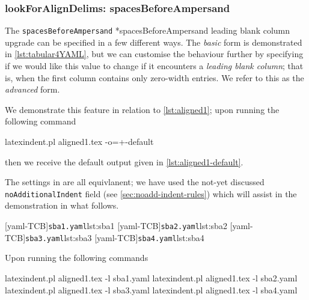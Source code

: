 \documentclass[10pt]{article}
\begin{document}
\subsubsection{lookForAlignDelims: spacesBeforeAmpersand}
 The \texttt{spacesBeforeAmpersand} *{spacesBeforeAmpersand leading
 blank column upgrade} can be specified in a few different ways. The \emph{basic} form is
 demonstrated in \cref{lst:tabular4YAML}, but we can customise the behaviour further by
 specifying if we would like this value to change if it encounters a \emph{leading blank
 column}; that is, when the first column contains only zero-width entries. We refer to
 this as the \emph{advanced} form.%

 \begin{example}
 We demonstrate this feature in relation to \cref{lst:aligned1}; upon running the
 following command

 \begin{commandshell}
latexindent.pl aligned1.tex -o=+-default
\end{commandshell}

 then we receive the default output given in \cref{lst:aligned1-default}.

 \begin{cmhtcbraster}
 \end{cmhtcbraster}

 The settings in  are all equivlanent; we have used the
 not-yet discussed \texttt{noAdditionalIndent} field (see \vref{sec:noadd-indent-rules})
 which will assist in the demonstration in what follows.
 \begin{cmhtcbraster}[raster columns=2, ]
  [yaml-TCB]{\texttt{sba1.yaml}}{lst:sba1}
  [yaml-TCB]{\texttt{sba2.yaml}}{lst:sba2}
  [yaml-TCB]{\texttt{sba3.yaml}}{lst:sba3}
  [yaml-TCB]{\texttt{sba4.yaml}}{lst:sba4}
 \end{cmhtcbraster}
 Upon running the following commands

 \begin{commandshell}
latexindent.pl aligned1.tex -l sba1.yaml
latexindent.pl aligned1.tex -l sba2.yaml
latexindent.pl aligned1.tex -l sba3.yaml
latexindent.pl aligned1.tex -l sba4.yaml
\end{commandshell}


\end{example}
\end{document}
